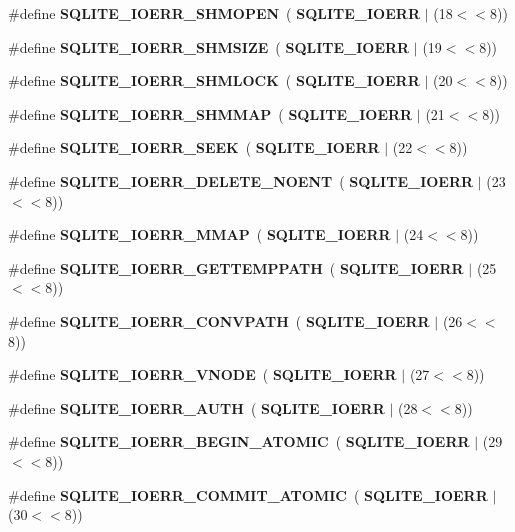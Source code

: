 \begin{DoxyCompactItemize}
\item 
\#define \textbf{ S\+Q\+L\+I\+T\+E\+\_\+\+I\+O\+E\+R\+R\+\_\+\+S\+H\+M\+O\+P\+EN}~(\textbf{ S\+Q\+L\+I\+T\+E\+\_\+\+I\+O\+E\+RR} $\vert$ (18$<$$<$8))
\item 
\#define \textbf{ S\+Q\+L\+I\+T\+E\+\_\+\+I\+O\+E\+R\+R\+\_\+\+S\+H\+M\+S\+I\+ZE}~(\textbf{ S\+Q\+L\+I\+T\+E\+\_\+\+I\+O\+E\+RR} $\vert$ (19$<$$<$8))
\item 
\#define \textbf{ S\+Q\+L\+I\+T\+E\+\_\+\+I\+O\+E\+R\+R\+\_\+\+S\+H\+M\+L\+O\+CK}~(\textbf{ S\+Q\+L\+I\+T\+E\+\_\+\+I\+O\+E\+RR} $\vert$ (20$<$$<$8))
\item 
\#define \textbf{ S\+Q\+L\+I\+T\+E\+\_\+\+I\+O\+E\+R\+R\+\_\+\+S\+H\+M\+M\+AP}~(\textbf{ S\+Q\+L\+I\+T\+E\+\_\+\+I\+O\+E\+RR} $\vert$ (21$<$$<$8))
\item 
\#define \textbf{ S\+Q\+L\+I\+T\+E\+\_\+\+I\+O\+E\+R\+R\+\_\+\+S\+E\+EK}~(\textbf{ S\+Q\+L\+I\+T\+E\+\_\+\+I\+O\+E\+RR} $\vert$ (22$<$$<$8))
\item 
\#define \textbf{ S\+Q\+L\+I\+T\+E\+\_\+\+I\+O\+E\+R\+R\+\_\+\+D\+E\+L\+E\+T\+E\+\_\+\+N\+O\+E\+NT}~(\textbf{ S\+Q\+L\+I\+T\+E\+\_\+\+I\+O\+E\+RR} $\vert$ (23$<$$<$8))
\item 
\#define \textbf{ S\+Q\+L\+I\+T\+E\+\_\+\+I\+O\+E\+R\+R\+\_\+\+M\+M\+AP}~(\textbf{ S\+Q\+L\+I\+T\+E\+\_\+\+I\+O\+E\+RR} $\vert$ (24$<$$<$8))
\item 
\#define \textbf{ S\+Q\+L\+I\+T\+E\+\_\+\+I\+O\+E\+R\+R\+\_\+\+G\+E\+T\+T\+E\+M\+P\+P\+A\+TH}~(\textbf{ S\+Q\+L\+I\+T\+E\+\_\+\+I\+O\+E\+RR} $\vert$ (25$<$$<$8))
\item 
\#define \textbf{ S\+Q\+L\+I\+T\+E\+\_\+\+I\+O\+E\+R\+R\+\_\+\+C\+O\+N\+V\+P\+A\+TH}~(\textbf{ S\+Q\+L\+I\+T\+E\+\_\+\+I\+O\+E\+RR} $\vert$ (26$<$$<$8))
\item 
\#define \textbf{ S\+Q\+L\+I\+T\+E\+\_\+\+I\+O\+E\+R\+R\+\_\+\+V\+N\+O\+DE}~(\textbf{ S\+Q\+L\+I\+T\+E\+\_\+\+I\+O\+E\+RR} $\vert$ (27$<$$<$8))
\item 
\#define \textbf{ S\+Q\+L\+I\+T\+E\+\_\+\+I\+O\+E\+R\+R\+\_\+\+A\+U\+TH}~(\textbf{ S\+Q\+L\+I\+T\+E\+\_\+\+I\+O\+E\+RR} $\vert$ (28$<$$<$8))
\item 
\#define \textbf{ S\+Q\+L\+I\+T\+E\+\_\+\+I\+O\+E\+R\+R\+\_\+\+B\+E\+G\+I\+N\+\_\+\+A\+T\+O\+M\+IC}~(\textbf{ S\+Q\+L\+I\+T\+E\+\_\+\+I\+O\+E\+RR} $\vert$ (29$<$$<$8))
\item 
\#define \textbf{ S\+Q\+L\+I\+T\+E\+\_\+\+I\+O\+E\+R\+R\+\_\+\+C\+O\+M\+M\+I\+T\+\_\+\+A\+T\+O\+M\+IC}~(\textbf{ S\+Q\+L\+I\+T\+E\+\_\+\+I\+O\+E\+RR} $\vert$ (30$<$$<$8))
\item 
$$
\end{DoxyCompactItemize}
